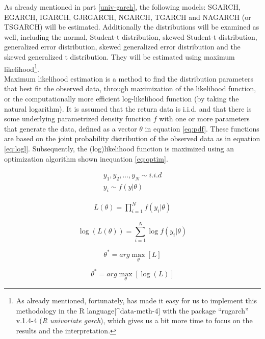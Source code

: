 \documentclass[a4paper, nobind]{templates/ociamthesis}
\begin{document}
\noindent As already mentioned in part \ref{univ-garch}, the following models: SGARCH, EGARCH, IGARCH, GJRGARCH, NGARCH, TGARCH and NAGARCH (or TSGARCH) will be estimated. Additionally the distributions will be examined as well, including the normal, Student-t distribution, skewed Student-t distribution, generalized error distribution, skewed generalized error distribution and the skewed generalized t distribution. They will be estimated using maximum likelihood\footnote{As already mentioned, fortunately, \textcite{alexios2020} has made it easy for us to implement this methodology in the R language{[}\^{}data-meth-4{]} \autocite{Rteam} with the package ``rugarch'' v.1.4-4 (\emph{R univariate garch}), which gives us a bit more time to focus on the results and the interpretation.}.~\\

\noindent Maximum likelihood estimation is a method to find the distribution parameters that best fit the observed data, through maximization of the likelihood function, or the computationally more efficient log-likelihood function (by taking the natural logarithm). It is assumed that the return data is i.i.d. and that there is some underlying parametrized density function \(f\) with one or more parameters that generate the data, defined as a vector \(\theta\) in equation \eqref{eq:pdf}. These functions are based on the joint probability distribution of the observed data as in equation \eqref{eq:logl}. Subsequently, the (log)likelihood function is maximized using an optimization algorithm shown inequation \eqref{eq:optim}.

\begin{align} 
  y_1,y_2,...,y_N \sim i.i.d
    \\
  y_i \sim f(y|\theta)
 \label{eq:pdf}
\end{align}

\begin{align} 
 L(\theta) = \prod^N_{i=1}f(y_i|\theta)
 \label{eq:logl}
\end{align}
\vspace{-15mm}

\[\log(L(\theta)) = \sum^N_{i=1} \log f(y_i |\theta)\]

\begin{equation} 
\theta^{*} = arg \max_{\theta} [ L] 
 \label{eq:optim}
\end{equation}
\vspace{-15mm}

\begin{equation} 
\theta^{*} = arg \max_{\theta} [\log(L)]
\end{equation}
\end{document}
